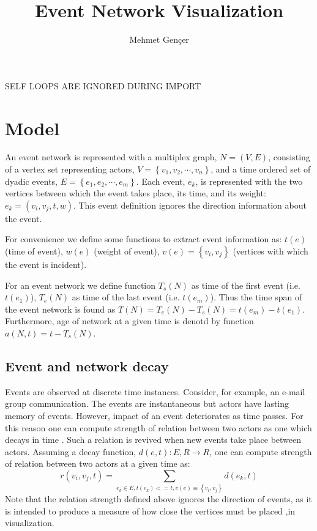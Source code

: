 \documentclass{article}
\begin{document}
\title{Event Network Visualization}
\author{Mehmet Gençer}
\date{}
\maketitle

SELF LOOPS ARE IGNORED DURING IMPORT

\section{Model}
An event network is represented with a multiplex graph, $N=(V,E)$, consisting of a vertex set representing actors, $V=\left\{v_1, v_2, \cdots, v_n\right\}$, and a time ordered set of dyadic events, $E=\left\{e_1, e_2, \cdots, e_m\right\}$. Each event, $e_k$, is represented with the two vertices between which the event takes place, its time, and its weight: $e_k=(v_i, v_j, t, w)$. This event definition ignores the direction information about the event. 

For convenience we define some functions to extract event information as: $t(e)$ (time of event), $w(e)$ (weight of event), $v(e)=\left\{v_i, v_j\right\}$ (vertices with which the event is incident). 

For an event network we define function $T_s(N)$ as time of the first event (i.e. $t(e_1)$), $T_e(N)$ as time of the last event (i.e. $t(e_m)$). Thus the time span of the event network is found as $T(N)=T_e(N)-T_s(N)=t(e_m)-t(e_1)$. Furthermore, age of network at a given time is denotd by function $a(N,t)=t-T_s(N)$.

\subsection{Event and network decay}
Events are observed at discrete time instances. Consider, for example, an e-mail group communication. The events are instantaneous but actors have lasting memory of events. However, impact of an event deteriorates as time passes. For this reason one can compute strength of relation between two actors as one which decays in time \citep{Brandes2009}. Such a relation is revived when new events take place between actors. Assuming a decay function, $d(e,t): E,R \to R$, one can compute strength of relation between two actors at a given time as:
\[ r(v_i,v_j,t)=\sum_{e_k \in E, t(e_k)<=t, v(e) \equiv \left\{v_i, v_j\right\} }{d(e_k,t)}\]
Note that the relation strength defined above ignores the direction of events, as it is intended to produce a measure of how close the vertices must be placed ,in visualization.
\end{document}
